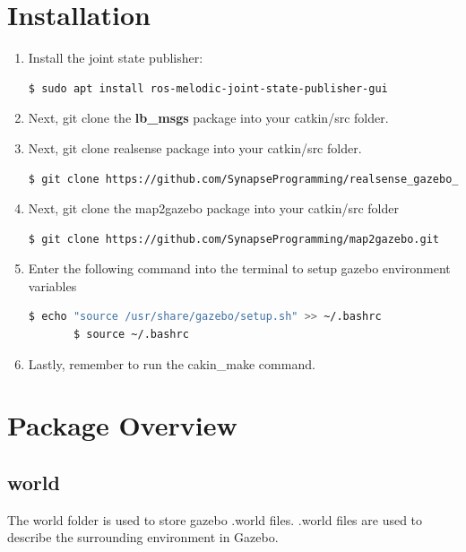 \documentclass[11pt]{article}
\begin{document}
\section{Installation}
\begin{enumerate}
 \item{Install the joint state publisher:
       \begin{lstlisting}[language=bash]
$ sudo apt install ros-melodic-joint-state-publisher-gui
       \end{lstlisting}
       }
 \item {
       Next, git clone the \textbf{lb\_msgs} package into your catkin/src folder.
       }
 \item{
       Next, git clone realsense package into your catkin/src folder.
       \begin{lstlisting}[language=bash]
$ git clone https://github.com/SynapseProgramming/realsense_gazebo_plugin.git
       \end{lstlisting}
       }

 \item{
       Next, git clone the map2gazebo package into your catkin/src folder

       \begin{lstlisting}[language=bash]
$ git clone https://github.com/SynapseProgramming/map2gazebo.git
       \end{lstlisting}
       }


 \item{
       Enter the following command into the terminal to setup gazebo environment variables
       \begin{lstlisting}[language=bash]
       $ echo "source /usr/share/gazebo/setup.sh" >> ~/.bashrc
       $ source ~/.bashrc
       \end{lstlisting}

       }
 \item{
       Lastly, remember to run the cakin\_make command.
       }

\end{enumerate}

\section{Package Overview}
\subsection{world}
The world folder is used to store gazebo .world files. .world files are used to describe the surrounding environment in Gazebo.
\end{document}
